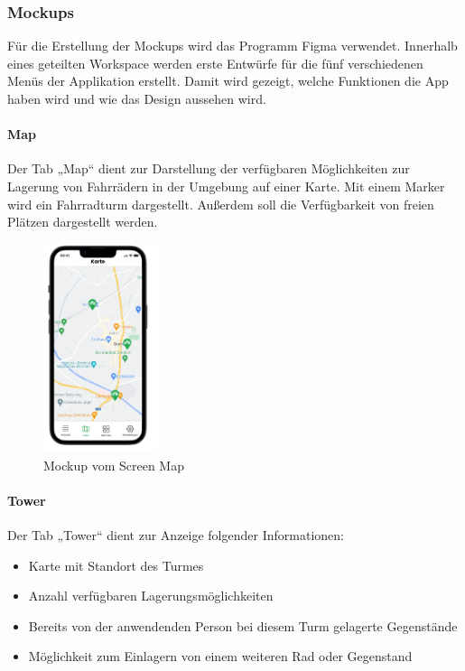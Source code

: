 \subsubsection{Mockups}
Für die Erstellung der \Gls{Mockup}s wird das Programm Figma verwendet. Innerhalb eines geteilten Workspace werden erste Entwürfe für die fünf verschiedenen Menüs der Applikation erstellt. Damit wird gezeigt, welche Funktionen die App haben wird und wie das Design aussehen wird.

\bigskip


\paragraph{Map}Der \Gls{Tab} „Map“ dient zur Darstellung der verfügbaren Möglichkeiten zur Lagerung von Fahrrädern in der Umgebung auf einer Karte. Mit einem Marker wird ein Fahrradturm dargestellt. Außerdem soll die Verfügbarkeit von freien Plätzen dargestellt werden.

\begin{figure}[H]
  \centering
  \includegraphics[width=0.3\textwidth]{images/app_mock_map}
  \caption{\Gls{Mockup} vom Screen Map}
  \label{fig:screenmapmock}
\end{figure}

\bigskip


\paragraph{Tower}Der \Gls{Tab} „Tower“ dient zur Anzeige folgender Informationen:

\begin{itemize}
  \item Karte mit Standort des Turmes
  \item Anzahl verfügbaren Lagerungsmöglichkeiten
  \item Bereits von der anwendenden Person bei diesem Turm gelagerte Gegenstände
  \item Möglichkeit zum Einlagern von einem weiteren Rad oder Gegenstand
\end{itemize}

